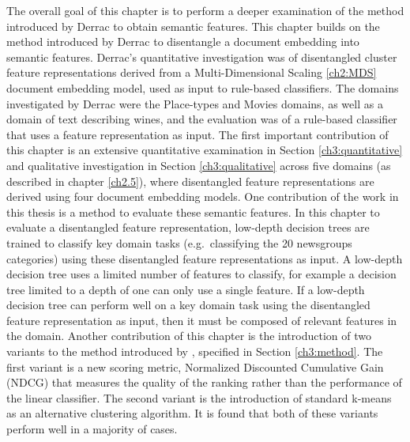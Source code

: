  
The overall goal of this chapter is to perform a deeper examination of the method introduced by Derrac \cite{Derrac2015}  to obtain semantic features.  This chapter builds on the  method introduced by Derrac \cite{Derrac2015} to disentangle a document embedding  into semantic features. Derrac's quantitative investigation was of disentangled cluster feature representations derived from a Multi-Dimensional Scaling \ref{ch2:MDS} document embedding model, used as input to rule-based classifiers. The domains investigated by Derrac were the Place-types and Movies domains, as well as a domain of text describing wines, and the evaluation was of a rule-based classifier that uses a feature representation as input. The first important  contribution of this chapter  is an extensive quantitative examination in Section \ref{ch3:quantitative} and qualitative investigation in Section \ref{ch3:qualitative} across five domains (as described in chapter \ref{ch2.5}), where disentangled feature representations  are derived using four  document embedding models.  One contribution of the work in this thesis is a method to evaluate these semantic features. In this chapter to evaluate a disentangled feature representation, low-depth decision trees are trained to classify key domain tasks (e.g.\ classifying the 20 newsgroups categories) using these disentangled feature representations as input. A low-depth decision tree uses a limited number of features to classify, for example a decision tree limited to a depth of one can only use a single feature. If a low-depth decision tree can perform well on a key domain task using the disentangled feature representation as input, then it must be composed of relevant features in the domain. Another contribution of this chapter is the introduction of two variants to  the method introduced by \cite{Derrac2015}, specified in Section \ref{ch3:method}. The first variant is a new scoring metric, Normalized Discounted Cumulative Gain (NDCG)  that  measures the quality of the ranking rather than the performance of the linear classifier. The second variant is the introduction of standard k-means as an alternative clustering algorithm. It is found that both of these variants perform well in a majority of cases. %
 

